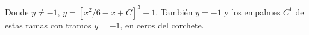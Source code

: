 Donde $y\ne-1$, $y=[x^2/6-x+C]^3-1$. También $y=-1$ y los empalmes $C^1$ de estas ramas con tramos $y=-1$, en ceros del corchete.
